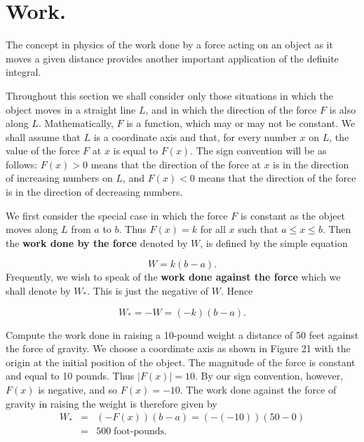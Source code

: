 \section{Work.}
The concept in physics of the work done by a force acting on an object as it moves a given distance provides another important application of the definite integral.

Throughout this section we shall consider only those situations in which
the object moves in a straight line $L$, and in which the direction of the force
$F$ is also along $L$. Mathematically, $F$ is a function, which may or may not be constant. We shall assume that $L$ is a coordinate axis and that, for every number $x$ on $L$, the value of the force $F$ at $x$ is equal to $F(x)$. The sign convention will be as follows: $F(x) > 0$ means that the direction of the force at $x$ is in the direction of increasing numbers on $L$, and $F(x) < 0$ means that the direction of the force is in the direction of decreasing numbers.

We first consider the special case in which the force $F$ is constant as the object moves along $L$ from $a$ to $b$. Thus $F(x)= k$ for all $x$ such that $a \leq x \leq b $. Then the \textbf{work done by the force} denoted by $W$, is defined by the simple equation

\begin{equation}
W = k(b - a). 
\label{eq8.5.1}
\end{equation}
\noindent Frequently, we wish to speak of the \textbf{work done against the force} which we shall denote by $W_*$. This is just the negative of $W$. Hence

\begin{equation}
W_* = -W = (-k)(b - a)  .
\label{eq8.5.2}
\end{equation}

\begin{example}
Compute the work done in raising a 10-pound weight a distance of 50 feet against the force of gravity. We choose a coordinate axis as shown in Figure 21 with the origin at the initial position of the object. The magnitude of the force is constant and equal to 10 pounds. Thus $|F(x)| = 10$. By our sign convention, however, $F(x)$ is negative, and so $F(x) = - 10$. The work done against the force of gravity in raising the weight is therefore given by
\begin{eqnarray*}
W_* &=& (-F(x))(b - a) = ( -( -10))(50 - 0) \\
        &=& 500 \;\mbox{foot-pounds.}
\end{eqnarray*}
\end{example}

